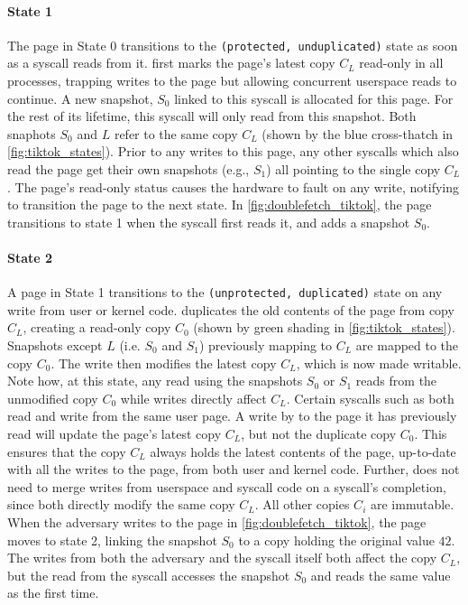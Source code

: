 \documentclass[letterpaper,twocolumn,10pt, anonymous]{article}
\begin{document}
\paragraph{State 1}
The page in State 0 transitions to the \texttt{(protected, unduplicated)} state as soon as a syscall 
reads from it.
\tiktok first marks the page's latest copy $C_L$ read-only in all processes, 
trapping writes to the page but allowing concurrent userspace reads to continue.
A new snapshot, $S_0$ linked to this syscall is allocated for this page.
For the rest of its lifetime, this syscall will only read from this snapshot.
Both snaphots $S_0$ and $L$ refer to the same copy $C_L$ (shown by the 
blue cross-thatch in \autoref{fig:tiktok_states}).
Prior to any writes to this page, any other syscalls which also read the page  
get their own snapshots (e.g., $S_1$) all pointing to the single copy $C_L$.
The page's read-only status causes the hardware to fault on any write,
notifying \tiktok to transition the page to the next state.
In \autoref{fig:doublefetch_tiktok}, the page transitions to state 1 when 
the syscall first reads it, and adds a snapshot $S_0$.

\paragraph{State 2}
A page in State 1 transitions to the \texttt{(unprotected, duplicated)} state 
on any write from user or kernel code.
\tiktok duplicates the old contents of the page from copy $C_L$, creating a 
read-only copy $C_0$ (shown by green shading in \autoref{fig:tiktok_states}).
Snapshots except $L$ (i.e. $S_0$ and $S_1$) previously mapping to $C_L$ are 
mapped to the copy $C_0$.
The write then modifies the latest copy $C_L$, which is now made writable.
Note how, at this state, any read using the snapshots $S_0$ or $S_1$ reads 
from the unmodified copy $C_0$ while writes directly affect $C_L$.
Certain syscalls such as  both read and write from 
the same user page. 
A write by  to the page it has previously read will update
the page's latest copy $C_L$, but not the duplicate copy $C_0$.
This ensures that the copy $C_L$ always holds the latest contents of the page, 
up-to-date with all the writes to the page, from both user and kernel code. 
Further, \tiktok does not need to merge writes from userspace and syscall code
on a syscall's completion, since both directly modify the same copy $C_L$.
All other copies $C_i$ are immutable.
When the adversary writes to the page in \autoref{fig:doublefetch_tiktok}, the
page moves to state 2, linking the snapshot $S_0$ to a copy holding the 
original value $42$.
The writes from both the adversary and the syscall itself both affect 
the copy $C_L$, but the read from the syscall accesses the snapshot $S_0$
and reads the same value as the first time.
\end{document}
